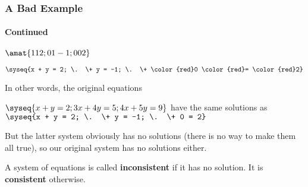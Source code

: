 
\begin{frame}
\frametitle{A Bad Example}
\framesubtitle{Continued}

\begin{center}
  $\amat{
  1 1 2;
  0 1 -1;
  0 0 2}$
  \;\;
  \begin{webonly}\def\r{\color{red}}
    $\syseq{x + y = 2; \. \+ y = -1; \. \+ \r0 \r= \r2}$
  \end{webonly}
\end{center}

\pause\medskip
In other words, the original equations
\begin{center}
  $\syseq{x + y = 2;
    3x + 4y = 5;
    4x + 5y = 9
  }$
  \qquad have the same solutions as \qquad
  $\syseq{x + y = 2; \. \+ y = -1; \. \+ 0 = 2}$
\end{center}

\pause\medskip
But the latter system obviously has no solutions (there is no way to make them
all true), so our original system has no solutions either.

\pause
\bigskip

\begin{defn}
  A system of equations is called \textbf{inconsistent} if it has no solution.
  It is \textbf{consistent} otherwise.
\end{defn}

\end{frame}


